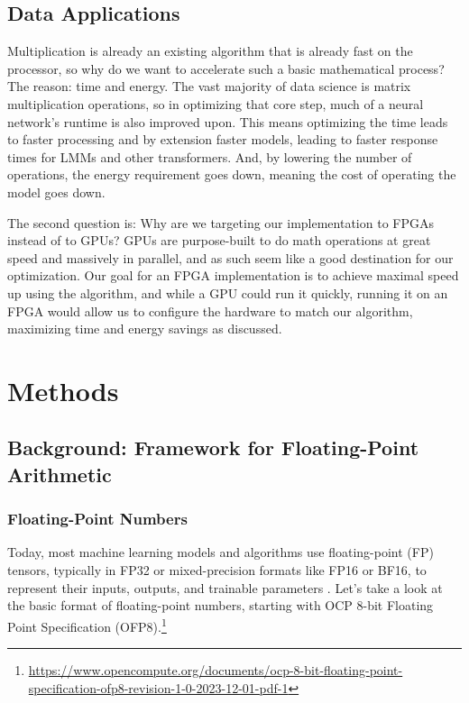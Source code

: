 \documentclass[12pt,letterpaper]{article}
\begin{document}
\subsection{Data Applications}

Multiplication is already an existing algorithm that is already fast on the processor, so why do we want to accelerate such a basic mathematical process? The reason: time and energy. The vast majority of data science is matrix multiplication operations, so in optimizing that core step, much of a neural network’s runtime is also improved upon. This means optimizing the time leads to faster processing and by extension faster models, leading to faster response times for LMMs and other transformers. And, by lowering the number of operations, the energy requirement goes down, meaning the cost of operating the model goes down.

The second question is: Why are we targeting our implementation to FPGAs instead of to GPUs? GPUs are purpose-built to do math operations at great speed and massively in parallel, and as such seem like a good destination for our optimization. Our goal for an FPGA implementation is to achieve maximal speed up using the algorithm, and while a GPU could run it quickly, running it on an FPGA would allow us to configure the hardware to match our algorithm, maximizing time and energy savings as discussed.


\section{Methods}

\subsection{Background: Framework for Floating-Point Arithmetic}

\subsubsection*{Floating-Point Numbers}

Today, most machine learning models and algorithms use floating-point (FP) tensors, typically in FP32 or mixed-precision formats like FP16 or BF16, to represent their inputs, outputs, and trainable parameters \citep{luo2024addition}. Let's take a look at the basic format of floating-point numbers, starting with OCP 8-bit Floating Point Specification (OFP8).\footnote{\url{https://www.opencompute.org/documents/ocp-8-bit-floating-point-specification-ofp8-revision-1-0-2023-12-01-pdf-1}}
\end{document}
